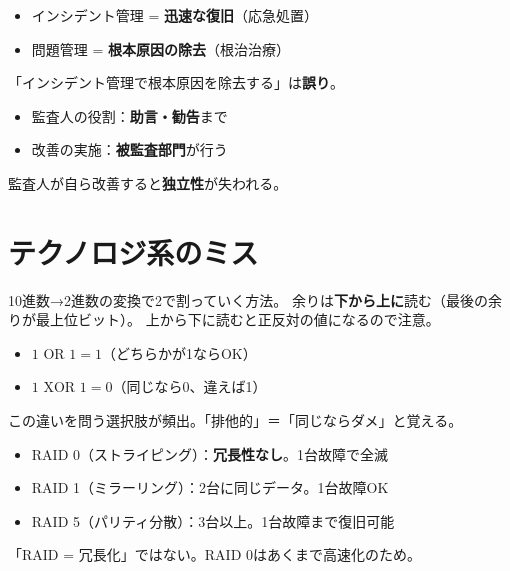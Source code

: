 \begin{yokumiss}[インシデント管理と問題管理の混同]
\begin{itemize}
  \item インシデント管理 = \textbf{迅速な復旧}（応急処置）
  \item 問題管理 = \textbf{根本原因の除去}（根治治療）
\end{itemize}
「インシデント管理で根本原因を除去する」は\textbf{誤り}。
\end{yokumiss}

\begin{yokumiss}
\begin{itemize}
  \item 監査人の役割：\textbf{助言・勧告}まで
  \item 改善の実施：\textbf{被監査部門}が行う
\end{itemize}
監査人が自ら改善すると\textbf{独立性}が失われる。
\end{yokumiss}

\section*{テクノロジ系のミス}

\begin{yokumiss}[2進数変換の余りの読み方]
10進数→2進数の変換で2で割っていく方法。
余りは\textbf{下から上に}読む（最後の余りが最上位ビット）。
上から下に読むと正反対の値になるので注意。
\end{yokumiss}

\begin{yokumiss}[ORとXORの結果の違い]
\begin{itemize}
  \item $1 \text{ OR } 1 = 1$（どちらかが1ならOK）
  \item $1 \text{ XOR } 1 = 0$（同じなら0、違えば1）
\end{itemize}
この違いを問う選択肢が頻出。「排他的」＝「同じならダメ」と覚える。
\end{yokumiss}

\begin{yokumiss}
\begin{itemize}
  \item RAID 0（ストライピング）：\textbf{冗長性なし}。1台故障で全滅
  \item RAID 1（ミラーリング）：2台に同じデータ。1台故障OK
  \item RAID 5（パリティ分散）：3台以上。1台故障まで復旧可能
\end{itemize}
「RAID = 冗長化」ではない。RAID 0はあくまで高速化のため。
\end{yokumiss}

